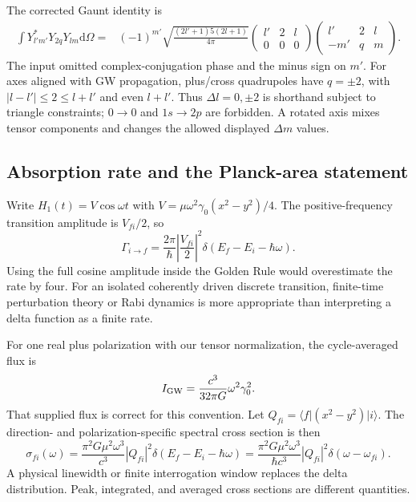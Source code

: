 \documentclass[a4paper,11pt]{article}
\newcommand{\dd}{\mathrm{d}}
\newcommand{\ket}[1]{\lvert #1\rangle}
\newcommand{\bra}[1]{\langle #1\rvert}
\begin{document}
The corrected Gaunt identity is
\begin{align}
 \int Y_{l'm'}^*Y_{2q}Y_{lm}\dd\Omega
 ={}&(-1)^{m'}\sqrt{\frac{(2l'+1)5(2l+1)}{4\pi}}
 \begin{pmatrix}l'&2&l\\0&0&0\end{pmatrix}
 \begin{pmatrix}l'&2&l\\-m'&q&m\end{pmatrix}.
\end{align}
The input omitted complex-conjugation phase and the minus sign on $m'$. For axes aligned with GW propagation, plus/cross quadrupoles have $q=\pm2$, with $|l-l'|\leq2\leq l+l'$ and even $l+l'$. Thus $\Delta l=0,\pm2$ is shorthand subject to triangle constraints; $0\to0$ and $1s\to2p$ are forbidden. A rotated axis mixes tensor components and changes the allowed displayed $\Delta m$ values.

\subsection{Absorption rate and the Planck-area statement}

Write $H_1(t)=V\cos\omega t$ with
$V=\mu\omega^2\gamma_0(x^2-y^2)/4$. The positive-frequency transition amplitude is $V_{fi}/2$, so
\begin{equation}
 \Gamma_{i\to f}=\frac{2\pi}{\hbar}\left|\frac{V_{fi}}2\right|^2
 \delta(E_f-E_i-\hbar\omega).
\end{equation}
Using the full cosine amplitude inside the Golden Rule would overestimate the rate by four. For an isolated coherently driven discrete transition, finite-time perturbation theory or Rabi dynamics is more appropriate than interpreting a delta function as a finite rate.

For one real plus polarization with our tensor normalization, the cycle-averaged flux is
\begin{equation}
 I_{\rm GW}=\frac{c^3}{32\pi G}\omega^2\gamma_0^2.
\end{equation}
That supplied flux is correct for this convention. Let $Q_{fi}=\bra f(x^2-y^2)\ket i$. The direction- and polarization-specific spectral cross section is then
\begin{equation}
 \sigma_{fi}(\omega)=\frac{\pi^2G\mu^2\omega^3}{c^3}|Q_{fi}|^2
 \delta(E_f-E_i-\hbar\omega)
 =\frac{\pi^2G\mu^2\omega^3}{\hbar c^3}|Q_{fi}|^2\delta(\omega-\omega_{fi}).
 \label{eq:xs}
\end{equation}
A physical linewidth or finite interrogation window replaces the delta distribution. Peak, integrated, and averaged cross sections are different quantities.
\end{document}
